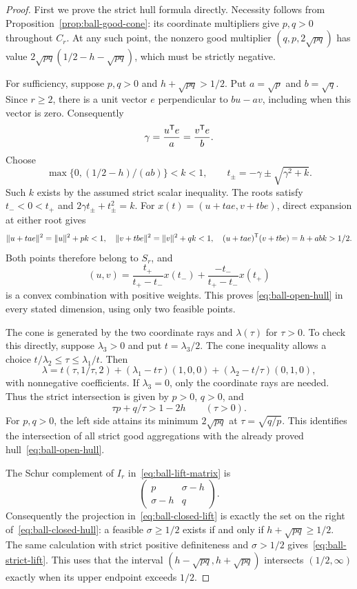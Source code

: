 \begin{proof}
First we prove the strict hull formula directly. Necessity follows from
Proposition~\ref{prop:ball-good-cone}: its coordinate multipliers give
$p,q>0$ throughout $C_r$. At any such point, the nonzero good multiplier
$(q,p,2\sqrt{pq})$ has value
$2\sqrt{pq}(1/2-h-\sqrt{pq})$, which must be strictly negative.

For sufficiency, suppose $p,q>0$ and $h+\sqrt{pq}>1/2$.
Put $a=\sqrt p$ and $b=\sqrt q$. Since $r\geq2$, there is a unit
vector $e$ perpendicular to $bu-av$, including when this vector is zero.
Consequently
\[
 \gamma=\frac{u^{\mathsf T} e}{a}=\frac{v^{\mathsf T} e}{b}.
\]
Choose
\[
 \max\{0,(1/2-h)/(ab)\}<k<1,\qquad
 t_\pm=-\gamma\pm\sqrt{\gamma^2+k}.
\]
Such $k$ exists by the assumed strict scalar inequality.
The roots satisfy $t_-<0<t_+$ and $2\gamma t_\pm+t_\pm^2=k$.
For $x(t)=(u+tae,v+tbe)$, direct expansion at either root gives
\[
 \|u+tae\|^2=\|u\|^2+pk<1,\quad
 \|v+tbe\|^2=\|v\|^2+qk<1,\quad
 (u+tae)^{\mathsf T}(v+tbe)=h+abk>1/2.
\]
Both points therefore belong to $S_r$, and
\[
 (u,v)=\frac{t_+}{t_+-t_-}x(t_-)
       +\frac{-t_-}{t_+-t_-}x(t_+)
\]
is a convex combination with positive weights. This proves
\eqref{eq:ball-open-hull} in every stated dimension, using only two
feasible points.

The cone is generated by the two coordinate rays and
$\lambda(\tau)$ for $\tau>0$. To check this directly, suppose
$\lambda_3>0$ and put $t=\lambda_3/2$. The cone inequality allows
a choice $t/\lambda_2\leq\tau\leq\lambda_1/t$. Then
\[
 \lambda=t(\tau,1/\tau,2)
       +(\lambda_1-t\tau)(1,0,0)
       +(\lambda_2-t/\tau)(0,1,0),
\]
with nonnegative coefficients. If $\lambda_3=0$, only the
coordinate rays are needed. Thus the strict intersection is given by
$p>0$, $q>0$, and
\begin{equation}\label{eq:ball-ray-inequality}
 \tau p+q/\tau>1-2h\qquad(\tau>0).
\end{equation}
For $p,q>0$, the left side attains its minimum $2\sqrt{pq}$ at
$\tau=\sqrt{q/p}$. This identifies the intersection of all strict good aggregations with
the already proved hull~\eqref{eq:ball-open-hull}.

The Schur complement of $I_r$ in~\eqref{eq:ball-lift-matrix} is
\[
 \begin{pmatrix}p&\sigma-h\\\sigma-h&q\end{pmatrix}.
\]
Consequently the projection in~\eqref{eq:ball-closed-lift} is
exactly the set on the right of~\eqref{eq:ball-closed-hull}:
a feasible $\sigma\geq1/2$ exists if and only if
$h+\sqrt{pq}\geq1/2$. The same calculation with strict positive
definiteness and $\sigma>1/2$ gives~\eqref{eq:ball-strict-lift}.
This uses that the interval $(h-\sqrt{pq},h+\sqrt{pq})$
intersects $(1/2,\infty)$ exactly when its upper endpoint exceeds
$1/2$.


\end{proof}
